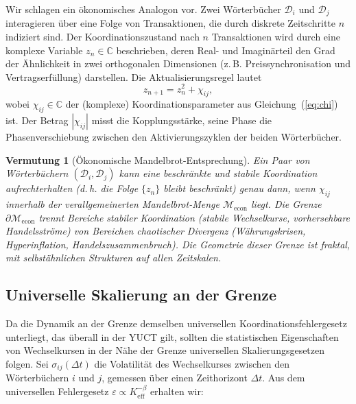 \documentclass[12pt,a4paper]{article}
\newtheorem{conjecture}[theorem]{Vermutung}
\theoremstyle{remark}
\begin{document}
	Wir schlagen ein ökonomisches Analogon vor. Zwei Wörterbücher \(\mathcal{D}_i\) und \(\mathcal{D}_j\) interagieren über eine Folge von Transaktionen, die durch diskrete Zeitschritte \(n\) indiziert sind. Der Koordinationszustand nach \(n\) Transaktionen wird durch eine komplexe Variable \(z_n \in \mathbb{C}\) beschrieben, deren Real- und Imaginärteil den Grad der Ähnlichkeit in zwei orthogonalen Dimensionen (z. B. Preissynchronisation und Vertragserfüllung) darstellen. Die Aktualisierungsregel lautet
	\begin{equation}
		z_{n+1} = z_n^2 + \chi_{ij},
		\label{eq:mandel_econ}
	\end{equation}
	wobei \(\chi_{ij} \in \mathbb{C}\) der (komplexe) Koordinationsparameter aus Gleichung~(\ref{eq:chi}) ist. Der Betrag \(|\chi_{ij}|\) misst die Kopplungsstärke, seine Phase die Phasenverschiebung zwischen den Aktivierungszyklen der beiden Wörterbücher.
	
	\begin{conjecture}[Ökonomische Mandelbrot-Entsprechung]
		Ein Paar von Wörterbüchern \((\mathcal{D}_i, \mathcal{D}_j)\) kann eine beschränkte und stabile Koordination aufrechterhalten (d. h. die Folge \(\{z_n\}\) bleibt beschränkt) genau dann, wenn \(\chi_{ij}\) innerhalb der verallgemeinerten Mandelbrot-Menge \(\mathcal{M}_{\mathrm{econ}}\) liegt. Die Grenze \(\partial\mathcal{M}_{\mathrm{econ}}\) trennt Bereiche stabiler Koordination (stabile Wechselkurse, vorhersehbare Handelsströme) von Bereichen chaotischer Divergenz (Währungskrisen, Hyperinflation, Handelszusammenbruch). Die Geometrie dieser Grenze ist fraktal, mit selbstähnlichen Strukturen auf allen Zeitskalen.
	\end{conjecture}
	
	\subsection{Universelle Skalierung an der Grenze}
	
	Da die Dynamik an der Grenze demselben universellen Koordinationsfehlergesetz unterliegt, das überall in der YUCT gilt, sollten die statistischen Eigenschaften von Wechselkursen in der Nähe der Grenze universellen Skalierungsgesetzen folgen. Sei \(\sigma_{ij}(\Delta t)\) die Volatilität des Wechselkurses zwischen den Wörterbüchern \(i\) und \(j\), gemessen über einen Zeithorizont \(\Delta t\). Aus dem universellen Fehlergesetz \(\varepsilon \propto K_{\mathrm{eff}}^{-\beta}\) erhalten wir:
	
\end{document}
